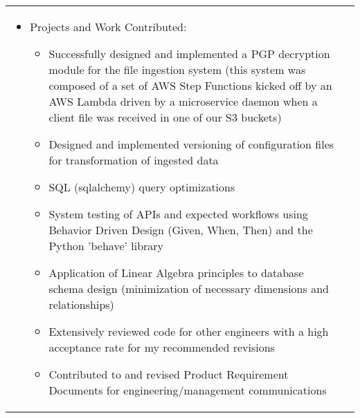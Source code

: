 \documentclass[a4paper,12pt]{article}
\begin{document}
\begin{tabularx}{\linewidth}{ @{}l r@{} }
{\begin{minipage}[t]{\linewidth}
\begin{itemize}[nosep,after=\strut, leftmargin=1em, itemsep=3pt]
    	\item Projects and Work Contributed:
		\begin{itemize}
    			\item Successfully designed and implemented a PGP decryption module for the file ingestion system (this system was composed of a set of AWS Step Functions kicked off by 				an AWS Lambda driven by a microservice daemon when a client file was received in one of our S3 buckets)
			\item Designed and implemented versioning of configuration files for transformation of ingested data
			\item SQL (sqlalchemy) query optimizations
			\item System testing of APIs and expected workflows using Behavior Driven Design (Given, When, Then) and the Python 'behave' library
			\item Application of Linear Algebra principles to database schema design (minimization of necessary dimensions and relationships)
   			\item Extensively reviewed code for other engineers with a high acceptance rate for my recommended revisions
    			\item Contributed to and revised Product Requirement Documents for engineering/management communications
		\end{itemize}


    \end{itemize}
    \end{minipage}
}
\end{tabularx}
\end{document}
